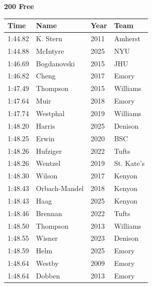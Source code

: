 \noindent\begin{minipage}[t]{0.98\textwidth}
\centering
\textbf{\textcolor{teamprimary}{200 Free}}\par
\vspace{0.5em}
\centering
\small
\renewcommand{\arraystretch}{1.0}
\setlength{\tabcolsep}{4pt}
\begin{tabular}{@{}p{2.5cm}p{4.5cm}p{1.5cm}p{2.5cm}@{}}
\toprule
\textbf{Time} & \textbf{Name} & \textbf{Year} & \textbf{Team} \\
\midrule
1:44.82 & K. Stern & 2011 & Amherst \\
1:44.88 & McIntyre & 2025 & NYU \\
1:46.69 & Bogdanovski & 2015 & JHU \\
1:46.82 & Cheng & 2017 & Emory \\
1:47.49 & Thompson & 2015 & Williams \\
1:47.64 & Muir & 2018 & Emory \\
1:47.74 & Westphal & 2019 & Williams \\
1:48.20 & Harris & 2025 & Denison \\
1:48.25 & Erwin & 2020 & BSC \\
1:48.26 & Hufziger & 2022 & Tufts \\
1:48.26 & Wentzel & 2019 & St. Kate's \\
1:48.30 & Wilson & 2017 & Kenyon \\
1:48.43 & Orbach-Mandel & 2018 & Kenyon \\
1:48.43 & Haag & 2025 & Kenyon \\
1:48.46 & Brennan & 2022 & Tufts \\
1:48.50 & Thompson & 2013 & Williams \\
1:48.55 & Wisner & 2023 & Denison \\
1:48.59 & Helm & 2025 & Emory \\
1:48.64 & Westby & 2009 & Emory \\
1:48.64 & Dobben & 2013 & Emory \\
\bottomrule
\end{tabular}
\end{minipage}
\vspace{1.2em}
